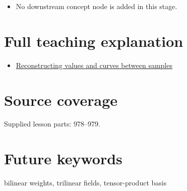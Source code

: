\begin{itemize}
\tightlist
\item
  No downstream concept node is added in this stage.
\end{itemize}

\section{Full teaching explanation}\label{appendix-0a09b6dfdc86-full-teaching-explanation}

\begin{itemize}
\tightlist
\item
  \href{Continuous\%20Notes/Computing\%20Foundations\%20-\%20From\%20Bits\%20to\%20C++\%20and\%20Systems\%20APIs\#Reconstructing\%20values\%20and\%20curves\%20between\%20samples}{Reconstructing values and curves between samples}
\end{itemize}

\section{Source coverage}\label{appendix-0a09b6dfdc86-source-coverage}

Supplied lesson parts: 978--979.

\section{Future keywords}\label{appendix-0a09b6dfdc86-future-keywords}

bilinear weights, trilinear fields, tensor-product basis
